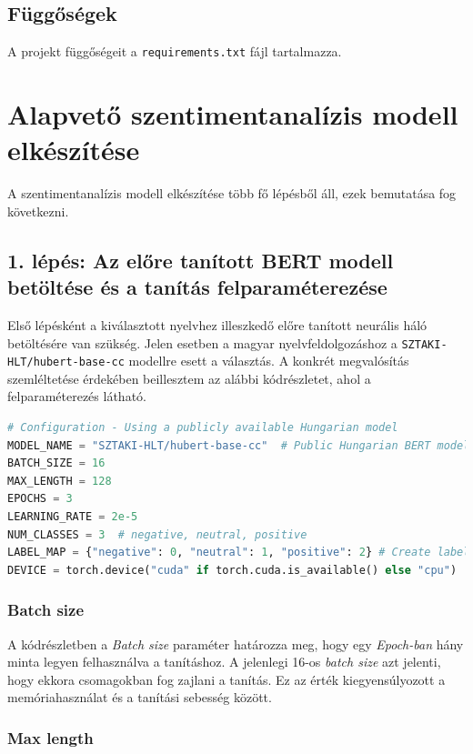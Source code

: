 \documentclass[12pt]{article}
\begin{document}
\subsection{Függőségek}

A projekt függőségeit a \texttt{requirements.txt} fájl tartalmazza.

\section{Alapvető szentimentanalízis modell elkészítése}

A szentimentanalízis modell elkészítése több fő lépésből áll, ezek bemutatása fog következni.

\subsection{1. lépés: Az előre tanított BERT modell betöltése és a tanítás felparaméterezése}

Első lépésként a kiválasztott nyelvhez illeszkedő előre tanított neurális háló betöltésére van szükség. Jelen esetben a magyar nyelvfeldolgozáshoz a \texttt{SZTAKI-HLT/hubert-base-cc} modellre esett a választás.
A konkrét megvalósítás szemléltetése érdekében beillesztem az alábbi kódrészletet, ahol a felparaméterezés látható.

\begin{lstlisting}[language=Python,caption=Modell konfiguráció]
# Configuration - Using a publicly available Hungarian model
MODEL_NAME = "SZTAKI-HLT/hubert-base-cc"  # Public Hungarian BERT model
BATCH_SIZE = 16
MAX_LENGTH = 128
EPOCHS = 3
LEARNING_RATE = 2e-5
NUM_CLASSES = 3  # negative, neutral, positive
LABEL_MAP = {"negative": 0, "neutral": 1, "positive": 2} # Create label mapping
DEVICE = torch.device("cuda" if torch.cuda.is_available() else "cpu")
\end{lstlisting}

\subsubsection{Batch size}

A kódrészletben a \textit{Batch size} paraméter határozza meg, hogy egy \textit{Epoch-ban} hány minta legyen felhasználva a tanításhoz. A jelenlegi 16-os \textit{batch size} azt jelenti, hogy ekkora csomagokban fog zajlani a tanítás. Ez az érték kiegyensúlyozott a memóriahasználat és a tanítási sebesség között.

\subsubsection{Max length}
\end{document}
